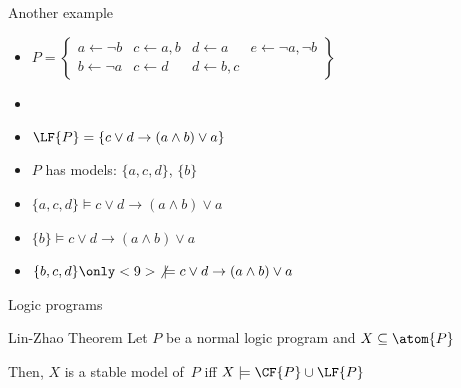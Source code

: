 \begin{frame}{Another example}
  \bigskip
  \begin{itemize}
  \item<1->
    \(
    P
    =
    \left\{
      \begin{array}{llll}
        a \leftarrow \neg b
      & c \leftarrow a,b
      & d \leftarrow a
      & e \leftarrow\neg a,\neg b
      \\
        b \leftarrow \neg a
      & c \leftarrow d
      & d \leftarrow b,c
      &
      \end{array}
    \right\}
    \)
    \bigskip
  \item<1-> []
    \begin{center}
      
    \end{center}
    \smallskip
  \item<1-> $\LF{P}=\{c\vee d\rightarrow (a\wedge b)\vee a\}$
  \item<2-> $P$ has  models:
    \alert<4-5>{$\{a,c,d\}$}, \alert<6-7>{$\{b\}$}
    \smallskip
  \item<only@4-5> $\{a,c,d\}              \models c\vee d\rightarrow (a\wedge b)\vee a$ \ 
  \item<only@6-7> $\{b\}                  \models c\vee d\rightarrow (a\wedge b)\vee a$ \ 
  \item<only@8->  $\{b,c,d\}\only<9>{\not}\models c\vee d\rightarrow (a\wedge b)\vee a$ \ 
  \end{itemize}
\end{frame}
\begin{frame}{Logic programs}
  \bigskip
  \begin{center}
    \begin{minipage}[t]{0.8\linewidth}
      \begin{block}{Lin-Zhao Theorem}
        Let $P$ be a normal logic program and $X\subseteq\atom{P}$
        \par\medskip
        Then, $X$ is a stable model of~$P$ iff $X\models\CF{P}\cup\LF{P}$
      \end{block}
    \end{minipage}
  \end{center}
\end{frame}
